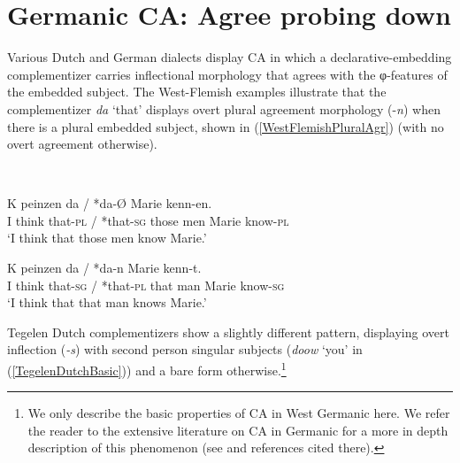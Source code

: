\section{Germanic CA: Agree probing down} \label{GermanicCA}

Various Dutch and German dialects display CA in which a declarative-embedding complementizer carries inflectional morphology that agrees with the φ-features of the embedded subject. The West-Flemish examples illustrate that the complementizer \textit{da} `that' displays overt plural agreement morphology (-\textit{n}) when there is a plural embedded subject, shown in (\ref{WestFlemishPluralAgr}) (with no overt agreement otherwise). 

\ea \label{InitialWestFlemishExample}
\\
\begin{xlist}

\ex \label{WestFlemishPluralAgr}
\gll K peinzen da / *da{-\O}  Marie kenn-en.\\
I 	think	that-\textsc{pl}	/	*that-\textsc{sg}	{those men}	Marie	know-\textsc{pl} \\
\glt `I think that those men know Marie.' 	

\ex \label{WestFlemishNo3rdAgr}
\gll K peinzen da\circled{-\O} / *da-n  Marie kenn-t.\\
I think that-\textsc{sg} / *that-\textsc{pl} {that man} Marie know-\textsc{sg} \\
\glt `I think that that man knows Marie.' 	

\end{xlist}

\z
\noindent Tegelen Dutch complementizers show a slightly different pattern, displaying overt inflection (\textit{-s}) with second person singular subjects (\textit{doow} `you' in (\ref{TegelenDutchBasic})) and a bare form otherwise.\footnote{We only describe the basic properties of CA in West Germanic here. We refer the reader to the extensive literature on CA in Germanic for a more in depth description of this phenomenon (see \citealt{vanKoppen:2017} and references cited there).}

